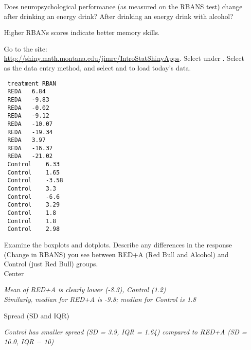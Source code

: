 \begin{enumerate}
  {\sf
    Does neuropsychological performance (as measured on the RBANS
    test) change after drinking an energy drink?  After drinking an
    energy drink with alcohol? }

   Higher RBANs scores indicate better memory skills. 

Go to the site:\\
  \url{http://shiny.math.montana.edu/jimrc/IntroStatShinyApps}. 
  Select  under . Select  as the data entry method, and
  select  and  to load today's
  data. 
 
 \begin{fmpage}{.3\linewidth}
 {\footnotesize
 \begin{verbatim}
 treatment RBAN
 REDA	6.84
 REDA	-9.83
 REDA	-0.02
 REDA	-9.12
 REDA	-10.07
 REDA	-19.34
 REDA	3.97
 REDA	-16.37
 REDA	-21.02
 Control	6.33
 Control	1.65
 Control	-3.58
 Control	3.3
 Control	-6.6
 Control	3.29
 Control	1.8
 Control	1.8
 Control	2.98
 \end{verbatim}
 }
 \end{fmpage}
 \hfill
 \begin{minipage}{.6\linewidth}

   Examine the boxplots and dotplots. Describe any differences in the response
   (Change in RBANS) you see  between RED+A (Red Bull and Alcohol) and Control
   (just Red Bull) groups. \\

   Center
\begin{students}
    \vspace{1.4cm}    
\end{students}

\begin{key}
  {\it Mean of RED+A is clearly  lower (-8.3), Control  (1.2)\\
  Similarly, median for RED+A is -9.8; median for Control is 1.8 }
\end{key}

   Spread  (SD and IQR)
\begin{students}
    \vspace{1.4cm}    
\end{students}

\begin{key}
  {\it      Control has smaller spread (SD = 3.9, IQR = 1.64)
     compared to  RED+A (SD = 10.0, IQR = 10) 
}
\end{key}



\end{minipage}
\end{enumerate}
